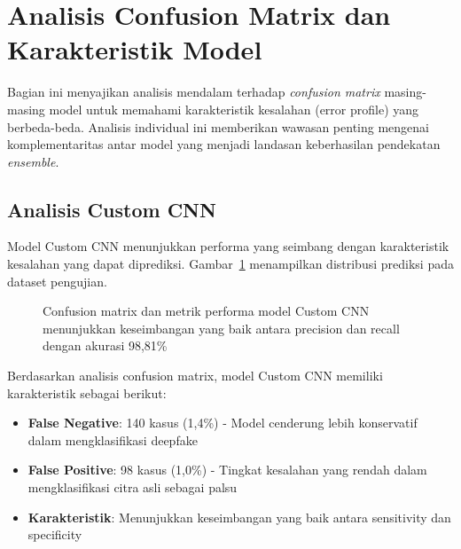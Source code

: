 \section{Analisis Confusion Matrix dan Karakteristik Model}

Bagian ini menyajikan analisis mendalam terhadap \textit{confusion matrix} masing-masing model untuk memahami karakteristik kesalahan (error profile) yang berbeda-beda. Analisis individual ini memberikan wawasan penting mengenai komplementaritas antar model yang menjadi landasan keberhasilan pendekatan \textit{ensemble}.

\subsection{Analisis Custom CNN}

Model Custom CNN menunjukkan performa yang seimbang dengan karakteristik kesalahan yang dapat diprediksi. Gambar~\ref{fig:conf_matrix_cnn} menampilkan distribusi prediksi pada dataset pengujian.

\begin{figure}[H]
    \centering
    \caption{Confusion matrix dan metrik performa model Custom CNN menunjukkan keseimbangan yang baik antara precision dan recall dengan akurasi 98,81\%}
    \label{fig:conf_matrix_cnn}
\end{figure}

Berdasarkan analisis confusion matrix, model Custom CNN memiliki karakteristik sebagai berikut:
\begin{itemize}
    \item \textbf{False Negative}: 140 kasus (1,4\%) - Model cenderung lebih konservatif dalam mengklasifikasi deepfake
    \item \textbf{False Positive}: 98 kasus (1,0\%) - Tingkat kesalahan yang rendah dalam mengklasifikasi citra asli sebagai palsu
    \item \textbf{Karakteristik}: Menunjukkan keseimbangan yang baik antara sensitivity dan specificity
\end{itemize}

